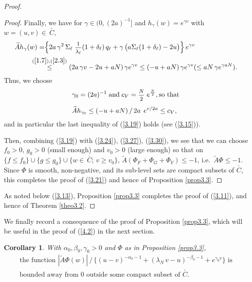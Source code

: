 \documentclass[12pt,leqno]{article}
\def\dis{\displaystyle}
\def\f{\footnotesize}
\def\wt{\widetilde}
\newtheorem{corollary}[theorem]{Corollary}
\begin{document}
\begin{proof}
\begin{proof}
\medskip
Finally, we have for $\gamma \in (0,(2a)^{-1}]$ and $h_\gamma(w)  = e^{\gamma v}$ with $w = (u,v) \in \, \stackrel{_\circ}{C}$,
\begin{equation}\label{3.28}
\begin{split}
\wt{A} h_\gamma(w)  = & \Big\{ 2 a \, \gamma^2 \, \Sigma_\ell \; \mbox{\f $\dis\frac{1}{\lambda_\ell}$} (1 + \delta_\ell)\, q_\ell + \gamma\,\big(a \Sigma_\ell ( 1+ \delta_\ell) - 2u\big)\Big\} \, e^{\gamma v} 
\\
&\hspace{-4.9ex} \stackrel{(\ref{1.7}),(\ref{2.3})}{\le} (2 a\, \gamma v - 2 u + a N) \, \gamma e^{\gamma v} \le ( - u + a N) \, \gamma e^{\gamma v} (\le a N \, \gamma e^{\gamma a N}).
\end{split}
\end{equation}
Thus, we choose
\begin{align}
&\gamma_0 = (2a)^{-1} \; \mbox{and} \; c_V = \mbox{\f $\dis\frac{N}{2}$} \;e^{\frac{N}{2}} , \mbox{so that} \label{3.29}
\\[1ex]
& \wt{A} h_{\gamma_0} \le (-u + a N) \, / \, 2 a \;\, e^{v / 2a} \le c_V, \label{3.30}
\end{align}
and in particular the last inequality of (\ref{3.19}) holds (see (\ref{3.15})).

\medskip
Then, combining (\ref{3.19}) with (\ref{3.24}), (\ref{3.27}), (\ref{3.30}), we see that we can choose $f_0 > 0$, $g_0 > 0$ (small enough) and $v_0 > 0$ (large enough) so that on $\{f \le f_0\} \cup \{g \le g_0\} \cup \{w \in \,\stackrel{_\circ}{C}$; $v \ge v_0\}$, $\wt{A} ( \Phi_F + \Phi_G + \Phi_V) \le -1$, i.e.~$\wt{A} \Phi \le -1$. Since $\Phi$ is smooth, non-negative, and its sub-level sets are compact subsets of $\stackrel{_\circ}{C}$, this completes the proof of (\ref{3.21}) and hence of Proposition \ref{prop3.3}.
\end{proof}

As noted below (\ref{3.13}), Proposition \ref{prop3.3} completes the proof of (\ref{3.11}), and hence of Theorem \ref{theo3.2}.
\end{proof}

We finally record a consequence of the proof of Proposition \ref{prop3.3}, which will be useful in the proof of (\ref{4.2}) in the next section.

\begin{corollary}\label{cor3.4}
With $\alpha_0, \beta_0, \gamma_0 > 0$ and $\Phi$ as in Proposition \ref{prop3.3}, 
\begin{equation}\label{3.31}
\begin{array}{l}
\mbox{the function $|\wt{A} \Phi(w)| \, / \, \{(u-v)^{-\alpha_0 - 1} + (\lambda_N \, v-u)^{- \beta_0 - 1} + e^{\gamma_0 v}\}$ is}
\\
\mbox{bounded away from $0$ outside some compact subset of $\stackrel{_\circ}{C}$}.
\end{array}
\end{equation}
\end{corollary}
\end{document}
